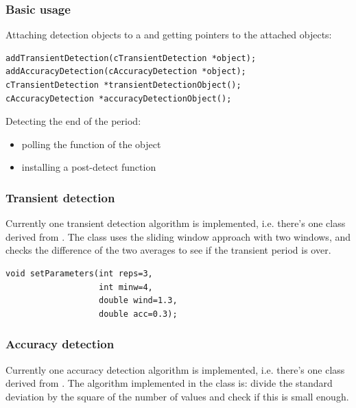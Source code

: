 \subsubsection{Basic usage}

%
%

Attaching detection objects to a  and getting pointers
to the attached objects:

\begin{verbatim}
addTransientDetection(cTransientDetection *object);
addAccuracyDetection(cAccuracyDetection *object);
cTransientDetection *transientDetectionObject();
cAccuracyDetection *accuracyDetectionObject();
\end{verbatim}


Detecting the end of the period:
\begin{itemize}
\item{polling the  function of the object}
\item{installing a post-detect function}
\end{itemize}


\subsubsection{Transient detection}


Currently one transient detection algorithm
is implemented, i.e.  there's one class derived from
. The  class
uses the sliding window approach with two windows, and checks the
difference of the two averages to see if the transient period is over.

\begin{verbatim}
void setParameters(int reps=3,
                   int minw=4,
                   double wind=1.3,
                   double acc=0.3);
\end{verbatim}

\subsubsection{Accuracy detection}


Currently one accuracy detection algorithm
is implemented, i.e.  there's one class derived from
. The algorithm implemented in the
 class is: divide the standard deviation by the
square of the number of values and check if this is small enough.

